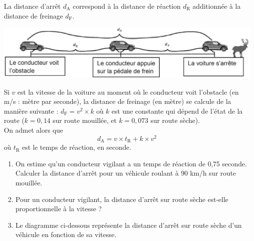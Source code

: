 \begin{exercice}[CRPE 2018 G1] %
   La distance d’arrêt $d_\text{A}$ correspond à la distance de réaction $d_\text{R}$ additionnée à la distance de freinage $d_\text{F}$.
   \begin{center}
      \includegraphics[width=14cm]{Organisation_gestion_donnees/Images/D5_ex_distance_arret}
   \end{center}
   Si $v$ est la vitesse de la voiture au moment où le conducteur voit l’obstacle (en m/s : mètre par seconde), la distance de freinage (en mètre) se calcule de la manière suivante : $d_\text{F} =v^2\times k$ où $k$ est une constante qui dépend de l’état de la route ($k =0,14$ sur route mouillée, et $k =0,073$ sur route sèche). \\
   On admet alors que $$d_\text{A} =v\times t_\text{R}+k\times v^2$$ où $t_\text{R}$ est le temps de réaction, en seconde.
   \begin{enumerate}
      \item On estime qu’un conducteur vigilant a un temps de réaction de 0,75 seconde. Calculer la distance d’arrêt pour un véhicule roulant à 90 km/h sur route mouillée.
      \item Pour un conducteur vigilant, la distance d’arrêt sur route sèche est-elle proportionnelle à la vitesse ? \medskip
      \item Le diagramme ci-dessous représente la distance d’arrêt sur route sèche d’un véhicule en fonction de sa vitesse. \smallskip
         \begin{center}

\end{center}
\end{enumerate}
\end{exercice}
